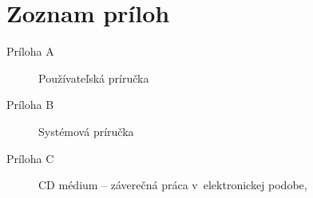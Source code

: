 
\chapter*{Zoznam príloh}

\begin{description}
    \item[Príloha A] Používateľská príručka
    \item[Príloha B] Systémová príručka
    \item[Príloha C] CD médium -- záverečná práca v~elektronickej podobe,
    
\end{description}

